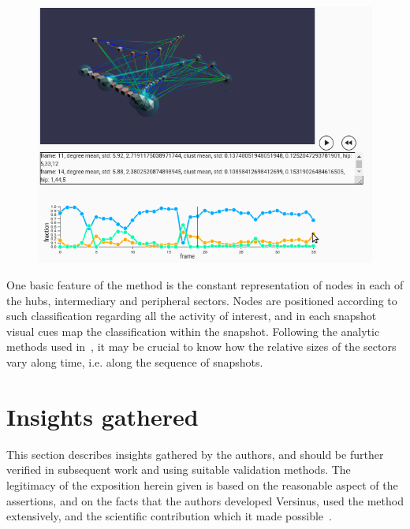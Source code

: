 \documentclass[runningheads]{llncs}
\begin{document}
\begin{figure}[!h]\centering
\includegraphics[width=\textwidth]{esfNetVis4}
  \caption{
  }\label{esfnetvis}
\end{figure}
One basic feature of the method is the constant representation of
nodes in each of the hubs, intermediary and peripheral sectors.
Nodes are positioned according to such classification regarding all
the activity of interest, and in each snapshot visual cues map the
classification within the snapshot.
Following the analytic methods used in~\cite{stab}, it may be crucial
to know how the relative sizes of the sectors vary along time, i.e. along
the sequence of snapshots.


\section{Insights gathered}\label{sec:ins}
This section describes insights gathered by the authors,
and should be further verified in subsequent work and using
suitable validation methods.
The legitimacy of the exposition herein given is based on the reasonable aspect of the assertions, and on the facts that the authors developed Versinus, used the method extensively, and the scientific contribution which it made possible~\cite{stab}.
\end{document}
